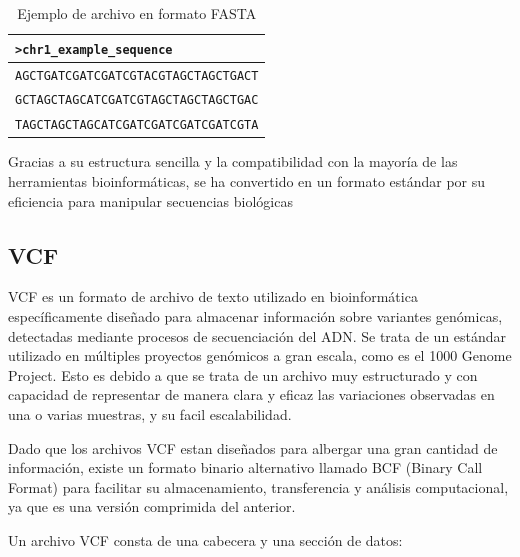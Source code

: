\documentclass[11pt,spanish,listoffigures,listoftables]{tfgetsinf}
\begin{document}
\begin{table}[H]
   \centering
   \caption{Ejemplo de archivo en formato \ac{FASTA}}
   \begin{tabular}{|l|}
   \hline
   \texttt{>chr1\_example\_sequence} \\ \hline
   \texttt{AGCTGATCGATCGATCGTACGTAGCTAGCTGACT} \\
   \texttt{GCTAGCTAGCATCGATCGTAGCTAGCTAGCTGAC} \\
   \texttt{TAGCTAGCTAGCATCGATCGATCGATCGATCGTA} \\
   \hline
   \end{tabular}
   \label{tabla:FASTA}
   \end{table}
   

Gracias a su estructura sencilla y la compatibilidad con la mayoría de las herramientas bioinformáticas, se ha convertido en un formato estándar por su eficiencia para manipular secuencias biológicas\cite{GEN}

\subsection{VCF}

\ac{VCF} es un formato de archivo de texto utilizado en bioinformática específicamente diseñado para almacenar información sobre variantes genómicas, detectadas mediante procesos de secuenciación del \ac{ADN}. Se trata de un estándar utilizado en múltiples proyectos genómicos a gran escala, como es el 1000 Genome Project\cite{AUT}. Esto es debido a que se trata de un archivo muy estructurado y con capacidad de representar de manera clara y eficaz las variaciones observadas en una o varias muestras, y su facil escalabilidad\cite{EMB}.

Dado que los archivos \ac{VCF} estan diseñados para albergar una gran cantidad de información, existe un formato binario alternativo llamado BCF (Binary Call Format) para facilitar su almacenamiento, transferencia y análisis computacional, ya que es una versión comprimida del anterior. 

Un archivo \ac{VCF} consta de una cabecera y una sección de datos: 
\end{document}
